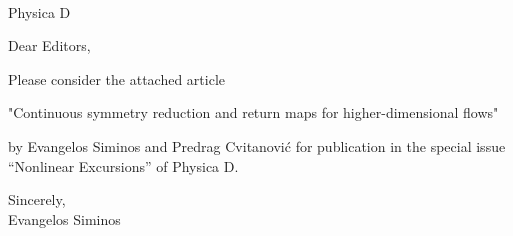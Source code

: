 \documentclass[12pt]{letter}
\begin{document}
\begin{letter}{
\\
Physica D\\

}


\opening{Dear Editors,}

Please consider the attached article

"Continuous symmetry reduction and return maps for higher-dimensional flows"

by Evangelos Siminos and Predrag Cvitanovi\'c for publication in the special
issue ``Nonlinear Excursions'' of Physica D.

\closing{Sincerely,\\ Evangelos Siminos}


\end{letter}
\end{document}
